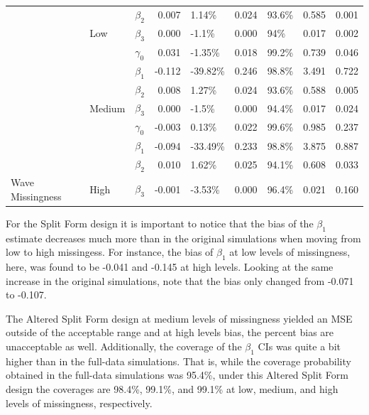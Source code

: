 \documentclass{svjour3}\usepackage[]{graphicx}\usepackage[]{color}
\newenvironment{knitrout}{}{} %
\begin{document}
\begin{knitrout}
\begin{table}[!h]
{\begin{tabular}[t]{l|l|l|r|l|r|l|r|r}
 &  & $\beta_2$ & 0.007 & 1.14\% & 0.024 & 93.6\% & 0.585 & 0.001\\

 & \multirow{-4}{*}{\raggedright\arraybackslash Low} & $\beta_3$ & 0.000 & -1.1\% & 0.000 & 94\% & 0.017 & 0.002\\

 &  & $\gamma_0$ & 0.031 & -1.35\% & 0.018 & 99.2\% & 0.739 & 0.046\\

 &  & $\beta_1$ & -0.112 & -39.82\% & 0.246 & 98.8\% & 3.491 & 0.722\\

 &  & $\beta_2$ & 0.008 & 1.27\% & 0.024 & 93.6\% & 0.588 & 0.005\\

 & \multirow{-4}{*}{\raggedright\arraybackslash Medium} & $\beta_3$ & 0.000 & -1.5\% & 0.000 & 94.4\% & 0.017 & 0.024\\

 &  & $\gamma_0$ & -0.003 & 0.13\% & 0.022 & 99.6\% & 0.985 & 0.237\\

 &  & $\beta_1$ & -0.094 & -33.49\% & 0.233 & 98.8\% & 3.875 & 0.887\\

 &  & $\beta_2$ & 0.010 & 1.62\% & 0.025 & 94.1\% & 0.608 & 0.033\\

\multirow{-12}{*}{\raggedright\arraybackslash Wave Missingness} & \multirow{-4}{*}{\raggedright\arraybackslash High} & $\beta_3$ & -0.001 & -3.53\% & 0.000 & 96.4\% & 0.021 & 0.160\\
\hline
\end{tabular}}
\end{table}


\end{knitrout}

For the Split Form design it is important to notice that the bias of the $\beta_1$ estimate decreases much more than in the original simulations when moving from low to high missingess. For instance, the bias of $\beta_1$ at low levels of missingness, here, was found to be -0.041 and -0.145 at high levels. Looking at the same increase in the original simulations, note that the bias only changed from -0.071 to -0.107. \par

The Altered Split Form design at medium levels of missingness yielded an MSE outside of the acceptable range and at high levels bias, the percent bias are unacceptable as well. Additionally, the coverage of the $\beta_1$ CIs was quite a bit higher than in the full-data simulations. That is, while the coverage probability obtained in the full-data simulations was 95.4\%, under this Altered Split Form design the coverages are 98.4\%, 99.1\%, and 99.1\% at low, medium, and high levels of missingness, respectively. \par
\end{document}
